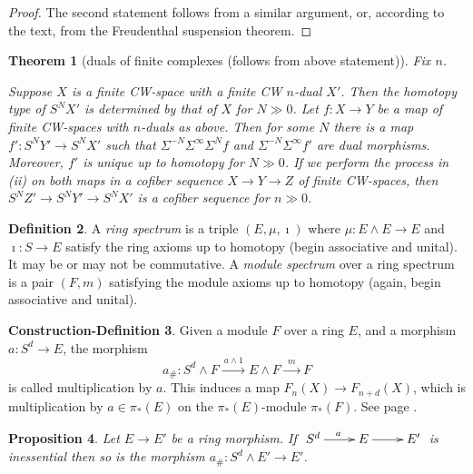 \documentclass[11pt]{article}
\theoremstyle{plain}
\newtheorem{thm}{Theorem}[subsection]
\newtheorem{prop}[thm]{Proposition}
\theoremstyle{definition}
\newtheorem{condef}[thm]{Construction-Definition}
\newtheorem{defn}[thm]{Definition}
\begin{document}
{\begin{proof}
The second statement follows from a similar argument, or, according to the text,
from the Freudenthal suspension theorem.
\end{proof}
\begin{thm}[duals of finite complexes {\small(follows from above statement)}]
Fix $n$.
\begin{itemise}
\itm[(i)]Suppose $X$ is a finite CW-space with a finite CW $n$-dual $X'$. Then
the homotopy type of $S^NX'$ is determined by that of $X$ for $N\gg0$.
\itm[(ii)] Let $f:X\to Y$ be a map of finite CW-spaces with $n$-duals as above.
Then for some $N$ there is a map $f':S^NY'\to S^NX'$ such that
$\Sigma^{-N}\Sigma^\infty \Sigma^Nf$ and $\Sigma^{-N}\Sigma^\infty f'$ are dual
morphisms. Moreover, $f'$ is unique up to homotopy for $N\gg0$.
\itm[(iii)]If we perform the process in \textup{(ii)} on both maps in a cofiber
sequence $X\to Y\to Z$ of finite CW-spaces, then $S^NZ'\to S^NY'\to S^NX'$ is a
cofiber sequence for $n\gg0$.
\end{itemise}
\end{thm}
\begin{defn}
A \emph{ring spectrum} is a triple $(E,\mu,\imath)$ where $\mu:E\wedge E\to E$
and $\imath:S\to E$ satisfy the ring axioms up to homotopy (begin associative
and unital). It may be or may not be commutative. A \emph{module spectrum} over
a ring spectrum is a pair $(F,m)$ satisfying the module axioms up to homotopy
(again, begin associative and unital).
\end{defn}
\setcounter{thm}{13}
\begin{condef}
Given a module $F$ over a ring $E$, and a morphism $a:S^d\to E$, the morphism
\[a_\#:S^d\wedge F\xrightarrow{\ a\wedge 1\ }
E\wedge F\xrightarrow{\ \ m\ \ } F\]
is called multiplication by $a$. This induces a map $F_n(X)\to F_{n+d}(X)$,
which is multiplication by $a\in\pi_*(E)$ on the $\pi_*(E)$-module $\pi_*(F)$.
See page \pageref{modulestructures}.
\end{condef}
\begin{prop}
Let $E\to E'$ be a ring morphism. If $\xymatrix{S^d\ar[r]^a&E\ar[r]&E'}$ is
inessential then so is the morphism $a_\#:S^d\wedge E'\to E'$.
\end{prop}
}   %
\end{document}
